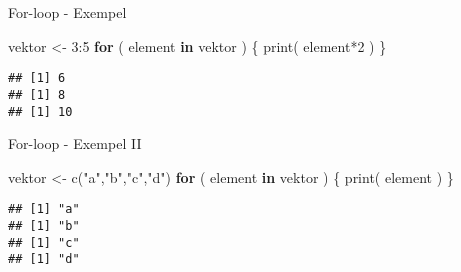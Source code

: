 \documentclass[
  11pt,
  ignorenonframetext,
]{beamer}
\newenvironment{Shaded}{\begin{snugshade}}{\end{snugshade}}
\newcommand{\ControlFlowTok}[1]{\textcolor[rgb]{0.13,0.29,0.53}{\textbf{#1}}}
\newcommand{\DecValTok}[1]{\textcolor[rgb]{0.00,0.00,0.81}{#1}}
\newcommand{\FunctionTok}[1]{\textcolor[rgb]{0.00,0.00,0.00}{#1}}
\newcommand{\NormalTok}[1]{#1}
\newcommand{\OtherTok}[1]{\textcolor[rgb]{0.56,0.35,0.01}{#1}}
\newcommand{\SpecialCharTok}[1]{\textcolor[rgb]{0.00,0.00,0.00}{#1}}
\newcommand{\StringTok}[1]{\textcolor[rgb]{0.31,0.60,0.02}{#1}}
\begin{document}
\begin{frame}[fragile]{For-loop - Exempel}
\protect\hypertarget{for-loop---exempel}{}
\begin{Shaded}
\begin{Highlighting}[]
\NormalTok{vektor }\OtherTok{\textless{}{-}} \DecValTok{3}\SpecialCharTok{:}\DecValTok{5}
\ControlFlowTok{for}\NormalTok{ ( element }\ControlFlowTok{in}\NormalTok{ vektor ) \{}
  \FunctionTok{print}\NormalTok{( element}\SpecialCharTok{*}\DecValTok{2}\NormalTok{ )}
\NormalTok{\}}
\end{Highlighting}
\end{Shaded}

\pause

\begin{verbatim}
## [1] 6
## [1] 8
## [1] 10
\end{verbatim}
\end{frame}

\begin{frame}[fragile]{For-loop - Exempel II}
\protect\hypertarget{for-loop---exempel-ii}{}
\begin{Shaded}
\begin{Highlighting}[]
\NormalTok{vektor }\OtherTok{\textless{}{-}} \FunctionTok{c}\NormalTok{(}\StringTok{"a"}\NormalTok{,}\StringTok{"b"}\NormalTok{,}\StringTok{"c"}\NormalTok{,}\StringTok{"d"}\NormalTok{)}
\ControlFlowTok{for}\NormalTok{ ( element }\ControlFlowTok{in}\NormalTok{ vektor ) \{}
  \FunctionTok{print}\NormalTok{( element )}
\NormalTok{\}}
\end{Highlighting}
\end{Shaded}

\pause

\begin{verbatim}
## [1] "a"
## [1] "b"
## [1] "c"
## [1] "d"
\end{verbatim}
\end{frame}
\end{document}
